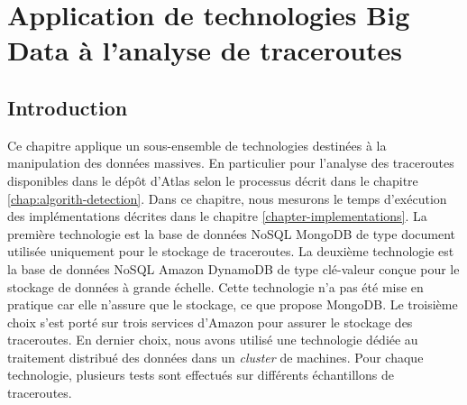 \chapter{Application de  technologies Big Data à l'analyse de  traceroutes} \label{chap:application-on-traceroutes}


\section{Introduction}

Ce chapitre applique un sous-ensemble de  technologies destinées  à la manipulation des données massives. En particulier  pour l'analyse des traceroutes disponibles dans le dépôt d'Atlas selon le processus décrit dans le chapitre \ref{chap:algorith-detection}. Dans ce chapitre, nous mesurons le temps d'exécution  des  implémentations  décrites dans le chapitre \ref{chapter-implementations}.  
 La première technologie est la base de données NoSQL MongoDB de type document  utilisée uniquement pour le stockage de traceroutes. La deuxième technologie est la base de données NoSQL  Amazon DynamoDB de type clé-valeur conçue pour le stockage de données à grande échelle. Cette technologie n'a pas été  mise en pratique car elle n'assure que le stockage, ce que propose MongoDB.
 Le troisième choix s'est porté sur trois services d'Amazon pour assurer le stockage des traceroutes. En dernier choix, nous avons  utilisé une technologie dédiée  au traitement distribué des données dans un \textit{cluster} de machines. Pour chaque technologie, plusieurs tests sont effectués sur différents échantillons de traceroutes.


 
